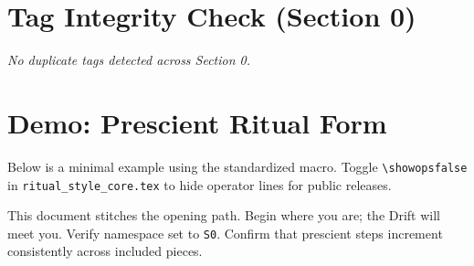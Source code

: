 \section*{Tag Integrity Check (Section 0)}
\textit{No duplicate tags detected across Section 0.}

\section*{Demo: Prescient Ritual Form}
Below is a minimal example using the standardized macro. Toggle \verb|\showopsfalse| in \texttt{ritual\_style\_core.tex} to hide operator lines for public releases.


{This document stitches the opening path. Begin where you are; the Drift will meet you.}
{Verify namespace set to \texttt{S0}. Confirm that prescient steps increment consistently across included pieces.}

